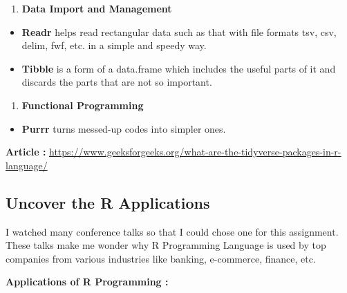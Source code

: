 \documentclass[
  letterpaper,
  DIV=11,
  numbers=noendperiod]{scrreprt}
\providecommand{\tightlist}{%
  \setlength{\itemsep}{0pt}\setlength{\parskip}{0pt}}\usepackage{longtable,booktabs,array}
\begin{document}
\begin{enumerate}
\def\labelenumi{\arabic{enumi}.}
\setcounter{enumi}{2}
\tightlist
\item
  \textbf{Data Import and Management}
\end{enumerate}

\begin{itemize}
\item
  \textbf{Readr} helps read rectangular data such as that with file
  formats tsv, csv, delim, fwf, etc. in a simple and speedy way.
\item
  \textbf{Tibble} is a form of a data.frame which includes the useful
  parts of it and discards the parts that are not so important.
\end{itemize}

\begin{enumerate}
\def\labelenumi{\arabic{enumi}.}
\setcounter{enumi}{3}
\tightlist
\item
  \textbf{Functional Programming}
\end{enumerate}

\begin{itemize}
\tightlist
\item
  \textbf{Purrr} turns messed-up codes into simpler ones.
\end{itemize}

\textbf{Article :}
\url{https://www.geeksforgeeks.org/what-are-the-tidyverse-packages-in-r-language/}

\hypertarget{uncover-the-r-applications}{%
\subsection{Uncover the R
Applications}\label{uncover-the-r-applications}}

I watched many conference talks so that I could chose one for this
assignment. These talks make me wonder why R Programming Language is
used by top companies from various industries like banking, e-commerce,
finance, etc.

\textbf{Applications of R Programming :}
\end{document}

